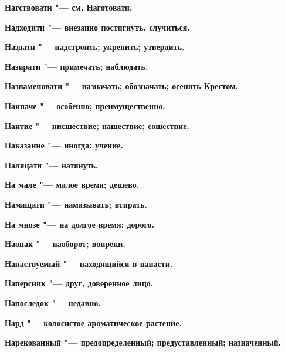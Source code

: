 \bfseries Нагствовати \normalfont{} "--- см. Наготовати. 




\bfseries Надходити \normalfont{} "--- внезапно постигнуть, случиться. 




\bfseries Наздати \normalfont{} "--- надстроить; укрепить; утвердить. 




\bfseries Назирати \normalfont{} "--- примечать; наблюдать. 




\bfseries Назнаменовати \normalfont{} "--- назначать; обозначать; осенять Крестом. 




\bfseries Наипаче \normalfont{} "--- особенно; преимущественно. 




\bfseries Наитие \normalfont{} "--- нисшествие; нашествие; сошествие. 




\bfseries Наказание \normalfont{} "--- иногда: учение. 




\bfseries Наляцати \normalfont{} "--- натянуть. 




\bfseries На мале \normalfont{} "--- малое время; дешево. 




\bfseries Намащати \normalfont{} "--- намазывать; втирать. 




\bfseries На мнозе \normalfont{} "--- на долгое время; дорого. 




\bfseries Наопак \normalfont{} "--- наоборот; вопреки. 




\bfseries Напаствуемый \normalfont{} "--- находящийся в напасти. 




\bfseries Наперсник \normalfont{} "--- друг, доверенное лицо. 




\bfseries Напоследок \normalfont{} "--- недавно. 




\bfseries Нард \normalfont{} "--- колосистое ароматическое растение. 




\bfseries Нарекованный \normalfont{} "--- предопределенный; предуставленный; назначенный. 




